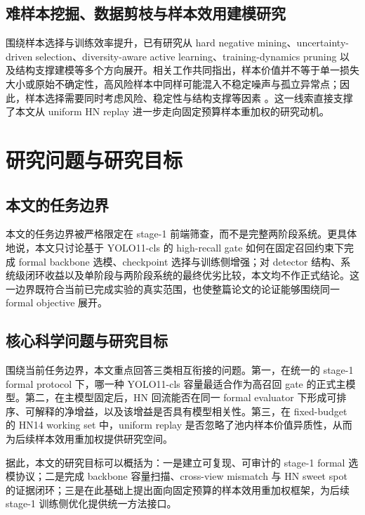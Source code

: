 \documentclass[UTF8,openany,12pt]{ctexbook}
\begin{document}
\subsection{难样本挖掘、数据剪枝与样本效用建模研究}
围绕样本选择与训练效率提升，已有研究从 hard negative mining、uncertainty-driven selection、diversity-aware active learning、training-dynamics pruning 以及结构支撑建模等多个方向展开。相关工作共同指出，样本价值并不等于单一损失大小或原始不确定性，高风险样本中同样可能混入不稳定噪声与孤立异常点；因此，样本选择需要同时考虑风险、稳定性与结构支撑等因素 \cite{koh2017influence,ash2020badge,wu2022entropy,yang2024plug,kim2024structural,zhang2024tdds}。这一线索直接支撑了本文从 uniform HN replay 进一步走向固定预算样本重加权的研究动机。

\section{研究问题与研究目标}
\subsection{本文的任务边界}
本文的任务边界被严格限定在 stage-1 前端筛查，而不是完整两阶段系统。更具体地说，本文只讨论基于 YOLO11-cls 的 high-recall gate 如何在固定召回约束下完成 formal backbone 选模、checkpoint 选择与训练侧增强；对 detector 结构、系统级闭环收益以及单阶段与两阶段系统的最终优劣比较，本文均不作正式结论。这一边界既符合当前已完成实验的真实范围，也使整篇论文的论证能够围绕同一 formal objective 展开。

\subsection{核心科学问题与研究目标}
围绕当前任务边界，本文重点回答三类相互衔接的问题。第一，在统一的 stage-1 formal protocol 下，哪一种 YOLO11-cls 容量最适合作为高召回 gate 的正式主模型。第二，在主模型固定后，HN 回流能否在同一 formal evaluator 下形成可排序、可解释的净增益，以及该增益是否具有模型相关性。第三，在 fixed-budget 的 HN14 working set 中，uniform replay 是否忽略了池内样本价值异质性，从而为后续样本效用重加权提供研究空间。

据此，本文的研究目标可以概括为：一是建立可复现、可审计的 stage-1 formal 选模协议；二是完成 backbone 容量扫描、cross-view mismatch 与 HN sweet spot 的证据闭环；三是在此基础上提出面向固定预算的样本效用重加权框架，为后续 stage-1 训练侧优化提供统一方法接口。
\end{document}
